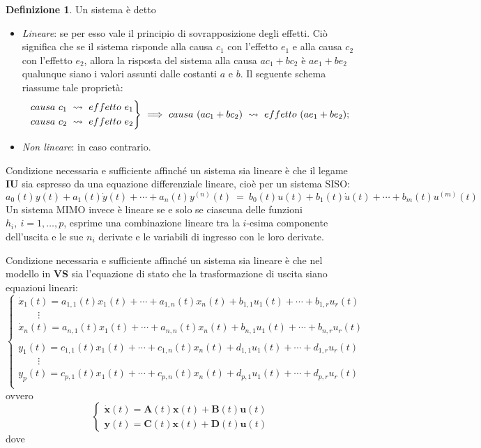 \documentclass[a4paper]{article}
\renewcommand{\vec}{\bm}
\theoremstyle{definition}
\newtheorem{defn}{Definizione}[subsection]
\begin{document}
			\begin{defn}
				Un sistema è detto
				\begin{itemize}
					\item \textit{Lineare}: se per esso vale il principio di sovrapposizione degli effetti. Ciò significa che se il sistema risponde alla causa $ c_1 $ con l'effetto $ e_1 $ e alla causa $ c_2 $ con l'effetto $ e_2 $, allora la risposta del sistema alla causa $ ac_1 + bc_2 $ è $ ae_1 + be_2 $ qualunque siano i valori assunti dalle costanti $ a $ e $ b $.
					Il seguente schema riassume tale proprietà:
					\[
						\begin{rcases*}
							causa\ c_1\ \rightsquigarrow\ effetto\ e_1 \\
							causa\ c_2\ \rightsquigarrow\ effetto\ e_2
						\end{rcases*}
						\
						\Longrightarrow
						\
						causa\ (ac_1 + bc_2)\ \rightsquigarrow\ effetto\ (ae_1 + be_2);
					\]
					\item \textit{Non lineare}: in caso contrario.
				\end{itemize}
			\end{defn}
			
		Condizione necessaria e sufficiente affinché un sistema sia lineare è che il legame \textbf{IU} sia espresso da una equazione differenziale	lineare, cioè per un sistema SISO:
		\[
			a_0(t) y(t) + a_1(t)\dot{y}(t) + \cdots + a_n(t) y^{(n)}(t)\ =\
			b_0(t) u(t) + b_1(t)\dot{u}(t) + \cdots + b_m(t)u^{(m)}(t)
		\]
		Un sistema MIMO invece è lineare se e solo se ciascuna delle funzioni $ h_i,\ i = 1,\dots , p $, esprime una combinazione lineare tra la $ i$-esima componente dell'uscita e le sue $ n_i $ derivate e le variabili di ingresso con le loro derivate.
		
		\bigskip
		
		Condizione necessaria e sufficiente affinché un
		sistema sia lineare è che nel modello in \textbf{VS} sia l'equazione di stato che la trasformazione di uscita siano equazioni lineari:
		\[
			\begin{cases}
				\dot{x}_1(t) = a_{1,1}(t) x_1(t) + \cdots + a_{1,n}(t) x_n(t) + b_{1,1} u_1(t) + \cdots + b_{1,r} u_r(t) \\
				\qquad\vdots \\
				\dot{x}_n(t) = a_{n,1}(t) x_1(t) + \cdots + a_{n,n}(t) x_n(t) + b_{n,1} u_1(t) + \cdots + b_{n,r} u_r(t) \\ \\
				y_1(t) = c_{1,1}(t) x_1(t) + \cdots + c_{1,n}(t) x_n(t) + d_{1,1} u_1(t) + \cdots + d_{1,r} u_r(t) \\
				\qquad\vdots \\
				y_p(t) = c_{p,1}(t) x_1(t) + \cdots + c_{p,n}(t) x_n(t) + d_{p,1} u_1(t) + \cdots + d_{p,r} u_r(t) \\
			\end{cases}
		\]
		ovvero
		\[
			\begin{cases}
				\vec{\dot{x}}(t) = \vec{A}(t)\vec{x}(t) + \vec{B}(t)\vec{u}(t) \\
				\vec{y}(t) = \vec{C}(t)\vec{x}(t) + \vec{D}(t)\vec{u}(t)
			\end{cases}
		\]
		dove
		
\end{document}
